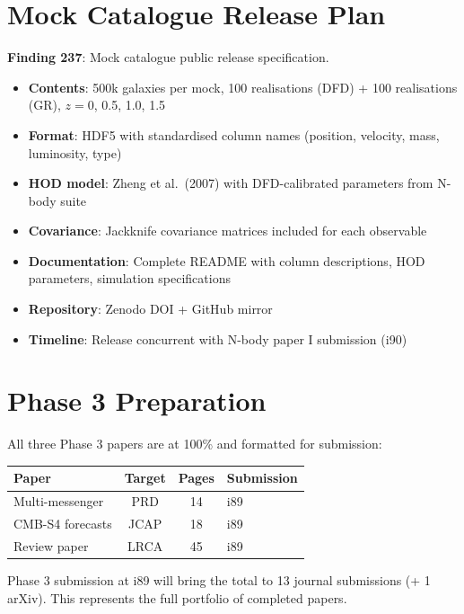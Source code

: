 \documentclass[11pt,a4paper]{article}
\begin{document}
\section{Mock Catalogue Release Plan}

\textbf{Finding 237}: Mock catalogue public release specification.

\begin{itemize}[nosep]
\item \textbf{Contents}: 500k galaxies per mock, 100 realisations (DFD) + 100 realisations (GR), $z = 0$, 0.5, 1.0, 1.5
\item \textbf{Format}: HDF5 with standardised column names (position, velocity, mass, luminosity, type)
\item \textbf{HOD model}: Zheng et al.\ (2007) with DFD-calibrated parameters from N-body suite
\item \textbf{Covariance}: Jackknife covariance matrices included for each observable
\item \textbf{Documentation}: Complete README with column descriptions, HOD parameters, simulation specifications
\item \textbf{Repository}: Zenodo DOI + GitHub mirror
\item \textbf{Timeline}: Release concurrent with N-body paper I submission (i90)
\end{itemize}

\section{Phase 3 Preparation}

All three Phase 3 papers are at 100\% and formatted for submission:

\begin{center}
\begin{tabular}{lccl}
\toprule
\textbf{Paper} & \textbf{Target} & \textbf{Pages} & \textbf{Submission} \\
\midrule
Multi-messenger & PRD & 14 & i89 \\
CMB-S4 forecasts & JCAP & 18 & i89 \\
Review paper & LRCA & 45 & i89 \\
\bottomrule
\end{tabular}
\end{center}

Phase 3 submission at i89 will bring the total to 13 journal submissions (+ 1 arXiv). This represents the full portfolio of completed papers.
\end{document}
